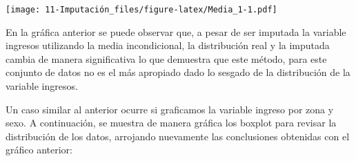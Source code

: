\documentclass[
  12pt,
]{book}
\newenvironment{Shaded}{\begin{snugshade}}{\end{snugshade}}
\newcommand{\AttributeTok}[1]{\textcolor[rgb]{0.77,0.63,0.00}{#1}}
\newcommand{\DocumentationTok}[1]{\textcolor[rgb]{0.56,0.35,0.01}{\textbf{\textit{#1}}}}
\newcommand{\FloatTok}[1]{\textcolor[rgb]{0.00,0.00,0.81}{#1}}
\newcommand{\FunctionTok}[1]{\textcolor[rgb]{0.00,0.00,0.00}{#1}}
\newcommand{\NormalTok}[1]{#1}
\newcommand{\OtherTok}[1]{\textcolor[rgb]{0.56,0.35,0.01}{#1}}
\newcommand{\SpecialCharTok}[1]{\textcolor[rgb]{0.00,0.00,0.00}{#1}}
\newcommand{\StringTok}[1]{\textcolor[rgb]{0.31,0.60,0.02}{#1}}
\begin{document}
\begin{Shaded}
\end{Shaded}

\texttt{[image: 11-Imputación\_files/figure-latex/Media\_1-1.pdf]}

En la gráfica anterior se puede observar que, a pesar de ser imputada la variable ingresos utilizando la media incondicional, la distribución real y la imputada cambia de manera significativa lo que demuestra que este método, para este conjunto de datos no es el más apropiado dado lo sesgado de la distribución de la variable ingresos.

Un caso similar al anterior ocurre si graficamos la variable ingreso por zona y sexo. A continuación, se muestra de manera gráfica los boxplot para revisar la distribución de los datos, arrojando nuevamente las conclusiones obtenidas con el gráfico anterior:
\end{document}
